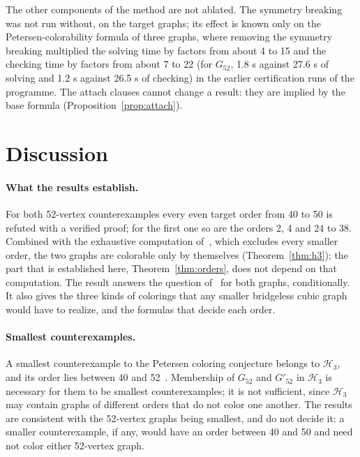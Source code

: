 \documentclass[11pt]{article}
\theoremstyle{definition}
\theoremstyle{remark}
\newcommand{\Hthree}{\mathcal{H}_3}
\newcommand{\Ga}{G_{52}}
\newcommand{\Gb}{G'_{52}}
\begin{document}
The other components of the method are not ablated. The symmetry breaking was not run without, on the target graphs; its effect is known only on the Petersen-colorability formula of three graphs, where removing the symmetry breaking multiplied the solving time by factors from about 4 to 15 and the checking time by factors from about 7 to 22 (for $\Ga$, 1.8 s against 27.6 s of solving and 1.2 s against 26.5 s of checking)
in the earlier certification runs of the programme. The attach clauses cannot change a result: they are implied by the base formula (Proposition~\ref{prop:attach}).

\section{Discussion}\label{sec:discussion}

\paragraph{What the results establish.} For both 52-vertex counterexamples every even target order from 40 to 50 is refuted with a verified proof; for the first one so are the orders 2, 4 and 24 to 38. Combined with the exhaustive computation of~\cite{GJMMMU2026}, which excludes every smaller order, the two graphs are colorable only by themselves
(Theorem~\ref{thm:h3}); the part that is established here, Theorem~\ref{thm:orders}, does not depend on that computation. The result answers the question of~\cite[Section~5.4]{GJMMMU2026} for both graphs, conditionally. It also gives the three
kinds of colorings that any smaller bridgeless cubic graph would have to realize, and the formulas that decide each order.

\paragraph{Smallest counterexamples.} A smallest counterexample to the Petersen coloring conjecture belongs to $\Hthree$, and its order lies between 40 and 52~\cite{GJMMMU2026}. Membership of $\Ga$ and $\Gb$ in $\Hthree$ is necessary for them to be smallest counterexamples; it is not sufficient, since $\Hthree$ may contain graphs of different orders that do not color
one another. The results are consistent with the 52-vertex graphs being smallest, and do not decide it: a smaller counterexample, if any, would have an order between 40 and 50 and need not color either 52-vertex graph.
\end{document}
